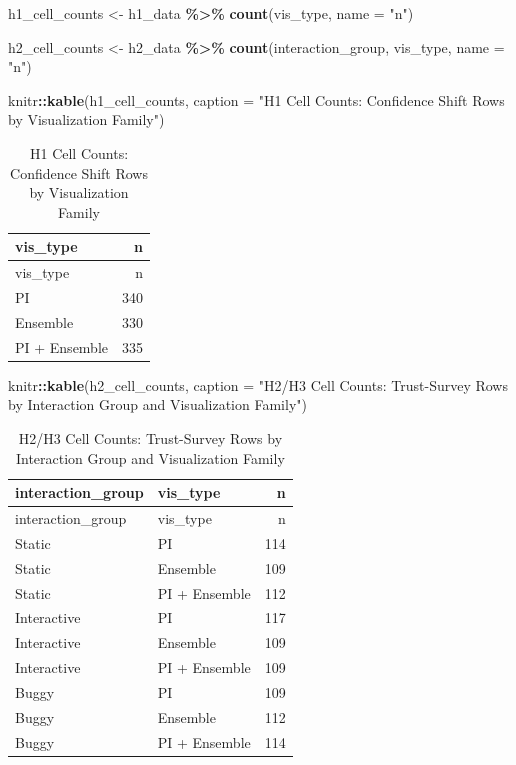 \documentclass[
]{article}
\newenvironment{Shaded}{\begin{snugshade}}{\end{snugshade}}
\newcommand{\AttributeTok}[1]{\textcolor[rgb]{0.13,0.29,0.53}{#1}}
\newcommand{\FunctionTok}[1]{\textcolor[rgb]{0.13,0.29,0.53}{\textbf{#1}}}
\newcommand{\NormalTok}[1]{#1}
\newcommand{\OtherTok}[1]{\textcolor[rgb]{0.56,0.35,0.01}{#1}}
\newcommand{\SpecialCharTok}[1]{\textcolor[rgb]{0.81,0.36,0.00}{\textbf{#1}}}
\newcommand{\StringTok}[1]{\textcolor[rgb]{0.31,0.60,0.02}{#1}}
\begin{document}
\begin{Shaded}
\begin{Highlighting}[]
\NormalTok{h1\_cell\_counts }\OtherTok{\textless{}{-}}\NormalTok{ h1\_data }\SpecialCharTok{\%\textgreater{}\%}
  \FunctionTok{count}\NormalTok{(vis\_type, }\AttributeTok{name =} \StringTok{"n"}\NormalTok{)}

\NormalTok{h2\_cell\_counts }\OtherTok{\textless{}{-}}\NormalTok{ h2\_data }\SpecialCharTok{\%\textgreater{}\%}
  \FunctionTok{count}\NormalTok{(interaction\_group, vis\_type, }\AttributeTok{name =} \StringTok{"n"}\NormalTok{)}

\NormalTok{knitr}\SpecialCharTok{::}\FunctionTok{kable}\NormalTok{(h1\_cell\_counts, }\AttributeTok{caption =} \StringTok{"H1 Cell Counts: Confidence Shift Rows by Visualization Family"}\NormalTok{)}
\end{Highlighting}
\end{Shaded}

\begin{longtable}[]{@{}lr@{}}
\caption{H1 Cell Counts: Confidence Shift Rows by Visualization
Family}\tabularnewline
\toprule\noalign{}
vis\_type & n \\
\midrule\noalign{}
\endfirsthead
\toprule\noalign{}
vis\_type & n \\
\midrule\noalign{}
\endhead
\bottomrule\noalign{}
\endlastfoot
PI & 340 \\
Ensemble & 330 \\
PI + Ensemble & 335 \\
\end{longtable}

\begin{Shaded}
\begin{Highlighting}[]
\NormalTok{knitr}\SpecialCharTok{::}\FunctionTok{kable}\NormalTok{(h2\_cell\_counts, }\AttributeTok{caption =} \StringTok{"H2/H3 Cell Counts: Trust{-}Survey Rows by Interaction Group and Visualization Family"}\NormalTok{)}
\end{Highlighting}
\end{Shaded}

\begin{longtable}[]{@{}llr@{}}
\caption{H2/H3 Cell Counts: Trust-Survey Rows by Interaction Group and
Visualization Family}\tabularnewline
\toprule\noalign{}
interaction\_group & vis\_type & n \\
\midrule\noalign{}
\endfirsthead
\toprule\noalign{}
interaction\_group & vis\_type & n \\
\midrule\noalign{}
\endhead
\bottomrule\noalign{}
\endlastfoot
Static & PI & 114 \\
Static & Ensemble & 109 \\
Static & PI + Ensemble & 112 \\
Interactive & PI & 117 \\
Interactive & Ensemble & 109 \\
Interactive & PI + Ensemble & 109 \\
Buggy & PI & 109 \\
Buggy & Ensemble & 112 \\
Buggy & PI + Ensemble & 114 \\
\end{longtable}
\end{document}
